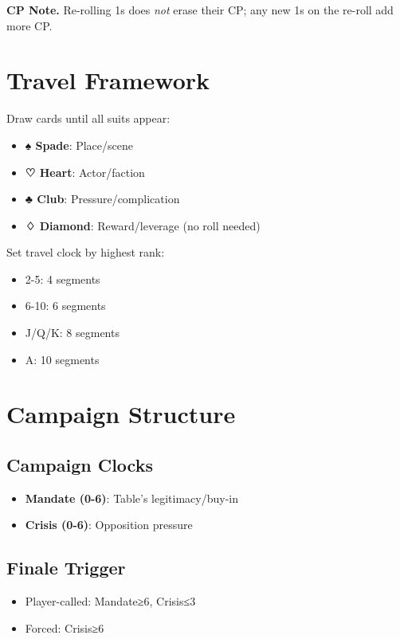 \documentclass[11pt]{article}
\begin{document}
\noindent\textbf{CP Note.} Re-rolling 1s does \emph{not} erase their CP; any new 1s on the re-roll add more CP.

\section{Travel Framework}

Draw cards until all suits appear:
\begin{itemize}
    \item \textbf{♠ Spade}: Place/scene
    \item \textbf{♡ Heart}: Actor/faction  
    \item \textbf{♣ Club}: Pressure/complication
    \item \textbf{♢ Diamond}: Reward/leverage (no roll needed)
\end{itemize}

Set travel clock by highest rank:
\begin{itemize}
    \item 2-5: 4 segments
    \item 6-10: 6 segments
    \item J/Q/K: 8 segments  
    \item A: 10 segments
\end{itemize}

\section{Campaign Structure}

\subsection{Campaign Clocks}
\begin{itemize}
    \item \textbf{Mandate (0-6)}: Table's legitimacy/buy-in
    \item \textbf{Crisis (0-6)}: Opposition pressure
\end{itemize}

\subsection{Finale Trigger}
\begin{itemize}
    \item Player-called: Mandate≥6, Crisis≤3
    \item Forced: Crisis≥6
\end{itemize}
\end{document}
